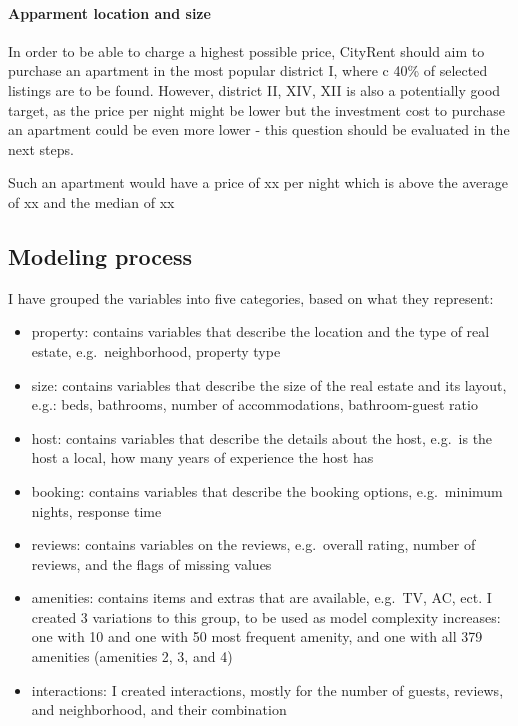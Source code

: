 \documentclass[
]{article}
\providecommand{\tightlist}{%
  \setlength{\itemsep}{0pt}\setlength{\parskip}{0pt}}
\begin{document}
\hypertarget{apparment-location-and-size}{%
\paragraph{Apparment location and
size}\label{apparment-location-and-size}}

In order to be able to charge a highest possible price, CityRent should
aim to purchase an apartment in the most popular district I, where c
40\% of selected listings are to be found. However, district II, XIV,
XII is also a potentially good target, as the price per night might be
lower but the investment cost to purchase an apartment could be even
more lower - this question should be evaluated in the next steps.

Such an apartment would have a price of xx per night which is above the
average of xx and the median of xx

\hypertarget{modeling-process}{%
\subsection{Modeling process}\label{modeling-process}}

I have grouped the variables into five categories, based on what they
represent:

\begin{itemize}
\tightlist
\item
  property: contains variables that describe the location and the type
  of real estate, e.g.~neighborhood, property type
\item
  size: contains variables that describe the size of the real estate and
  its layout, e.g.: beds, bathrooms, number of accommodations,
  bathroom-guest ratio
\item
  host: contains variables that describe the details about the host,
  e.g.~is the host a local, how many years of experience the host has
\item
  booking: contains variables that describe the booking options,
  e.g.~minimum nights, response time
\item
  reviews: contains variables on the reviews, e.g.~overall rating,
  number of reviews, and the flags of missing values
\item
  amenities: contains items and extras that are available, e.g.~TV, AC,
  ect. I created 3 variations to this group, to be used as model
  complexity increases: one with 10 and one with 50 most frequent
  amenity, and one with all 379 amenities (amenities 2, 3, and 4)
\item
  interactions: I created interactions, mostly for the number of guests,
  reviews, and neighborhood, and their combination
\end{itemize}
\end{document}
